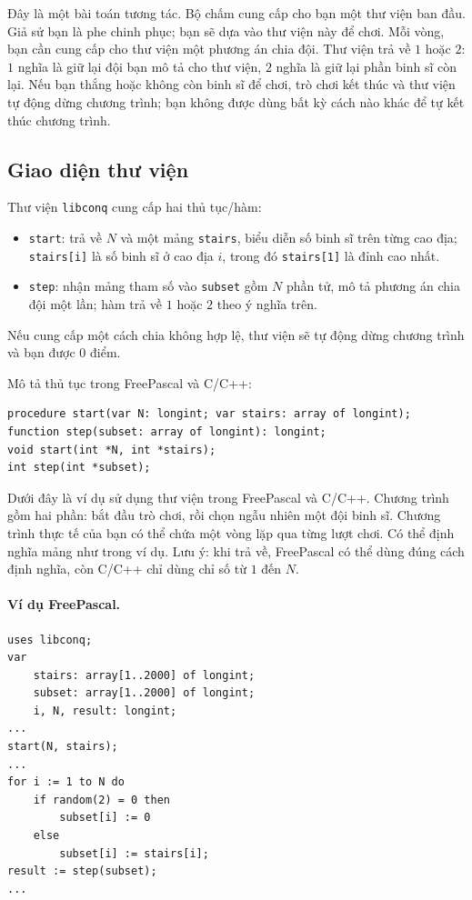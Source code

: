 \documentclass[11pt]{article}
\begin{document}
Đây là một bài toán tương tác. Bộ chấm cung cấp cho bạn một thư viện ban đầu.
Giả sử bạn là phe chinh phục; bạn sẽ dựa vào thư viện này để chơi. Mỗi vòng,
bạn cần cung cấp cho thư viện một phương án chia đội. Thư viện trả về \(1\)
hoặc \(2\): \(1\) nghĩa là giữ lại đội bạn mô tả cho thư viện, \(2\) nghĩa là
giữ lại phần binh sĩ còn lại. Nếu bạn thắng hoặc không còn binh sĩ để chơi,
trò chơi kết thúc và thư viện tự động dừng chương trình; bạn không được dùng
bất kỳ cách nào khác để tự kết thúc chương trình.

\subsection*{Giao diện thư viện}

Thư viện \texttt{libconq} cung cấp hai thủ tục/hàm:
\begin{itemize}
  \item \texttt{start}: trả về \(N\) và một mảng \texttt{stairs}, biểu diễn số
  binh sĩ trên từng cao địa; \texttt{stairs[i]} là số binh sĩ ở cao địa \(i\),
  trong đó \texttt{stairs[1]} là đỉnh cao nhất.
  \item \texttt{step}: nhận mảng tham số vào \texttt{subset} gồm \(N\) phần
  tử, mô tả phương án chia đội một lần; hàm trả về \(1\) hoặc \(2\) theo ý
  nghĩa trên.
\end{itemize}

Nếu cung cấp một cách chia không hợp lệ, thư viện sẽ tự động dừng chương trình
và bạn được \(0\) điểm.

Mô tả thủ tục trong FreePascal và C/C++:
\begin{verbatim}
procedure start(var N: longint; var stairs: array of longint);
function step(subset: array of longint): longint;
void start(int *N, int *stairs);
int step(int *subset);
\end{verbatim}

Dưới đây là ví dụ sử dụng thư viện trong FreePascal và C/C++. Chương trình gồm
hai phần: bắt đầu trò chơi, rồi chọn ngẫu nhiên một đội binh sĩ. Chương trình
thực tế của bạn có thể chứa một vòng lặp qua từng lượt chơi. Có thể định nghĩa
mảng như trong ví dụ. Lưu ý: khi trả về, FreePascal có thể dùng đúng cách định
nghĩa, còn C/C++ chỉ dùng chỉ số từ \(1\) đến \(N\).

\paragraph{Ví dụ FreePascal.}
\begin{verbatim}
uses libconq;
var
    stairs: array[1..2000] of longint;
    subset: array[1..2000] of longint;
    i, N, result: longint;
...
start(N, stairs);
...
for i := 1 to N do
    if random(2) = 0 then
        subset[i] := 0
    else
        subset[i] := stairs[i];
result := step(subset);
...
\end{verbatim}
\end{document}
